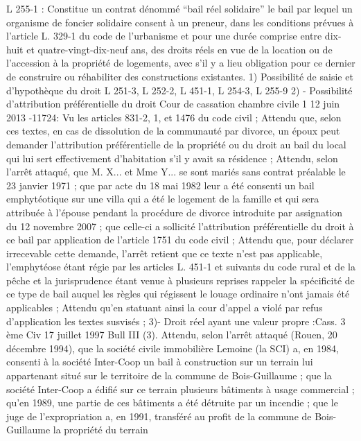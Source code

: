 \documentclass[11pt,a4paper]{report}
\begin{document}
	L 255-1 : Constitue un contrat dénommé “bail réel solidaire” le bail par lequel un organisme de foncier
	solidaire consent à un preneur, dans les conditions prévues à l'article L. 329-1 du code de l'urbanisme et pour
	une durée comprise entre dix-huit et quatre-vingt-dix-neuf ans, des droits réels en vue de la location ou de
	l'accession à la propriété de logements, avec s'il y a lieu obligation pour ce dernier de construire ou réhabiliter
	des constructions existantes.
	1) Possibilité de saisie et d’hypothèque du droit L 251-3, L 252-2, L 451-1, L 254-3, L 255-9
	2) - Possibilité d’attribution préférentielle du droit Cour de cassation chambre civile 1 12 juin 2013 -11724:
	Vu les articles 831-2, 1\degre , et 1476 du code civil ;
	Attendu que, selon ces textes, en cas de dissolution de la communauté par divorce, un époux peut demander
	l'attribution préférentielle de la propriété ou du droit au bail du local qui lui sert effectivement d'habitation s'il y
	avait sa résidence ;
	Attendu, selon l'arrêt attaqué, que M. X... et Mme Y... se sont mariés sans contrat préalable le 23 janvier 1971 ;
	que par acte du 18 mai 1982 leur a été consenti un bail emphytéotique sur une villa qui a été le logement de la
	famille et qui sera attribuée à l'épouse pendant la procédure de divorce introduite par assignation du 12
	novembre 2007 ; que celle-ci a sollicité l'attribution préférentielle du droit à ce bail par application de l'article
	1751 du code civil ;
	Attendu que, pour déclarer irrecevable cette demande, l'arrêt retient que ce texte n'est pas applicable,
	l'emphytéose étant régie par les articles L. 451-1 et suivants du code rural et de la pêche et la jurisprudence
	étant venue à plusieurs reprises rappeler la spécificité de ce type de bail auquel les règles qui régissent le louage
	ordinaire n'ont jamais été applicables ;
	Attendu qu'en statuant ainsi la cour d'appel a violé par refus d'application les textes susvisés ;
	3)- Droit réel ayant une valeur propre :Cass. 3 ème Civ 17 juillet 1997 Bull III  (3).
	Attendu, selon l'arrêt attaqué (Rouen, 20 décembre 1994), que la société civile immobilière Lemoine (la SCI) a,
	en 1984, consenti à la société Inter-Coop un bail à construction sur un terrain lui appartenant situé sur le
	territoire de la commune de Bois-Guillaume ; que la société Inter-Coop a édifié sur ce terrain plusieurs
	bâtiments à usage commercial ; qu'en 1989, une partie de ces bâtiments a été détruite par un incendie ; que le
	juge de l'expropriation a, en 1991, transféré au profit de la commune de Bois-Guillaume la propriété du terrain
\end{document}
